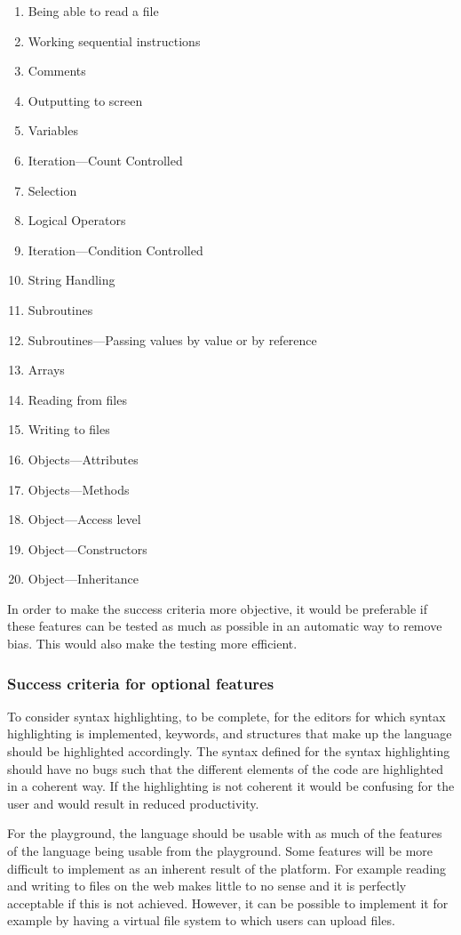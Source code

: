 \documentclass{article}
\begin{document}
\begin{enumerate}
	\item Being able to read a file
	\item Working sequential instructions
	\item Comments
	\item Outputting to screen
	\item Variables
	\item Iteration---Count Controlled
	\item Selection
	\item Logical Operators
	\item Iteration---Condition Controlled
	\item String Handling
	\item Subroutines
	\item Subroutines---Passing values by value or by reference
	\item Arrays
	\item Reading from files
	\item Writing to files
	\item Objects---Attributes
	\item Objects---Methods
	\item Object---Access level
	\item Object---Constructors
	\item Object---Inheritance
\end{enumerate}

In order to make the success criteria more objective, it would be preferable if
these features can be tested as much as possible in an automatic way to remove
bias. This would also make the testing more efficient.

\subsubsection{Success criteria for optional features}

To consider syntax highlighting, to be complete, for the editors for which syntax
highlighting is implemented, keywords, and structures that make up the language
should be highlighted accordingly. The syntax defined for the syntax
highlighting should have no bugs such that the different elements of the code
are highlighted in a coherent way. If the highlighting is not coherent it would
be confusing for the user and would result in reduced productivity.

For the playground, the language should be usable with as much of the features
of the language being usable from the playground. Some features will be more
difficult to implement as an inherent result of the platform. For example
reading and writing to files on the web makes little to no sense and it is
perfectly acceptable if this is not achieved. However, it can be possible to
implement it for example by having a virtual file system to which users can
upload files.
\end{document}
